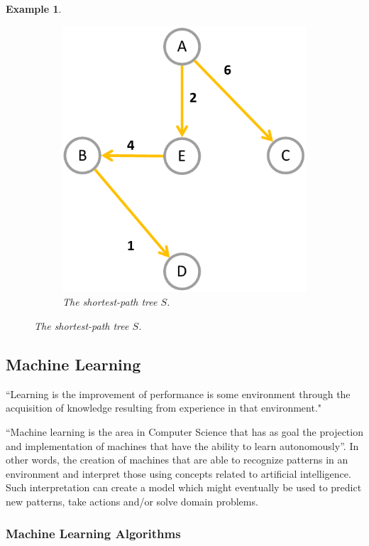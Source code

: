 \documentclass[12pt]{article}
\newtheorem{example}{Example}[section]
\begin{document}
\begin{example}
\begin{figure}[H]
\begin{subfigure}{.4\linewidth}
			\includegraphics[width=\linewidth]{spa-tree}
			\captionsetup{justification=centering}
			\caption{The shortest-path tree $S$.}
			\label{fig:spa-tree}
		\end{subfigure}
	\end{figure}
\end{example}

\subsection{Machine Learning}
“Learning is the improvement of performance is some environment through the acquisition of knowledge resulting from experience in that environment." \cite{pat1996}

“Machine learning is the area in Computer Science that has as goal the projection and implementation of machines that have the ability to learn autonomously”. \cite{hot2009} In other words, the creation of machines that are able to recognize patterns in an environment and interpret those using concepts related to artificial intelligence. Such interpretation can create a model which might eventually be used to predict new patterns, take actions and/or solve domain problems.

\subsubsection{Machine Learning Algorithms}
\end{document}
